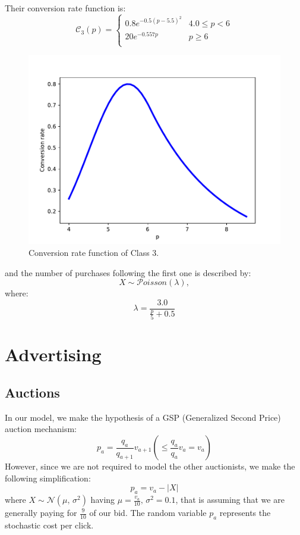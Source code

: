 \documentclass[12pt,a4paper]{report}
\begin{document}
Their conversion rate function is: \[   \mathcal C_3(p) = \left\{
\begin{array}{ll}
      0.8 e^{-0.5(p-5.5)^2} & 4.0\leq p< 6 \\
      20 e^{-0.557p} & p \geq 6 \\
\end{array} 
\right. \]
\begin{figure}[H]
\centering
  \includegraphics[scale = 0.7, center]{C3}
  \caption{Conversion rate function of Class 3.}
\end{figure}


and the number of purchases following the first one is described by: 
\[X \sim  \mathcal{P}oisson   (\lambda),\] where:
\[\lambda = \frac{3.0}{\frac p 5 +0.5}  \]


		\section{Advertising}

			\subsection{Auctions}
In our model, we make the hypothesis of a GSP (Generalized Second Price) auction mechanism:
	\[p_a= \frac{q_a}{q_{a+1}}v_{a+1} \left( \leq\frac{q_a}{q_a}v_a = v_a\right)\]
However, since we are not required to model the other auctionists, we make the following simplification:
	\[  p_a = v_a - |X|\] 
where $ X\sim \mathcal{N}(\mu,\,\sigma^{2})$ having $\mu = \frac{v_a}{10} ,\,\sigma^{2} = 0.1$,
that is assuming that we are generally paying for $\frac 9 {10}$ of our bid. The random variable $p_a$ represents the stochastic cost per click.
\end{document}
